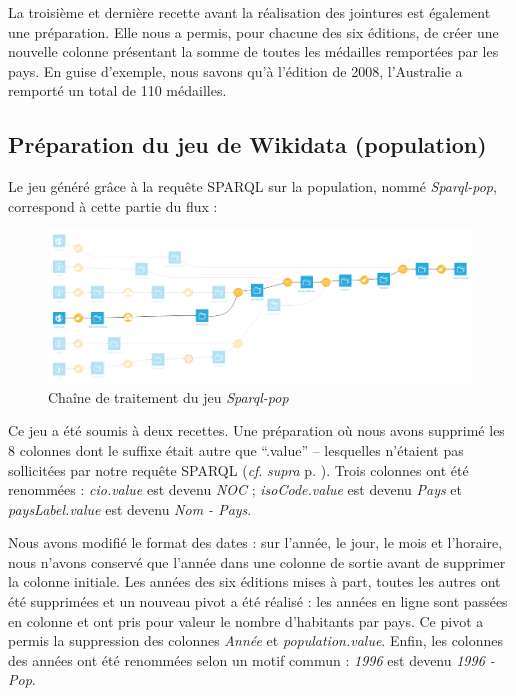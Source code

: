 \documentclass[hidelinks, 12pt]{report}
\begin{document}
La troisième et dernière recette avant la réalisation des jointures est également une préparation. Elle nous a permis, pour chacune des six éditions, de créer une nouvelle colonne présentant la somme de toutes les médailles remportées par les pays. En guise d'exemple, nous savons qu'à l'édition de 2008, l'Australie a remporté un total de 110 médailles.





%





\subsection{Préparation du jeu de Wikidata (population)}

Le jeu généré grâce à la requête SPARQL sur la population, nommé \textit{Sparql-pop}, correspond à cette partie du flux :

\begin{center}
	\begin{figure}[H]
		\setlength{\belowcaptionskip}{-35pt}
		\includegraphics[scale=0.35]{images/flow-medals-sparql-pop.png}
		\caption{Chaîne de traitement du jeu \textit{Sparql-pop}}
	\end{figure}
\end{center}

Ce jeu a été soumis à deux recettes. Une préparation où nous avons supprimé les 8 colonnes dont le suffixe était autre que \enquote{.value} -- lesquelles n'étaient pas sollicitées par notre requête SPARQL (\textit{cf}. \textit{supra} p. \pageref{nongrata}). Trois colonnes ont été renommées : \textit{cio.value} est devenu \textit{NOC} ; \textit{isoCode.value} est devenu \textit{Pays} et \textit{paysLabel.value} est devenu \textit{Nom - Pays}.

Nous avons modifié le format des dates : sur l'année, le jour, le mois et l'horaire, nous n'avons conservé que l'année dans une colonne de sortie avant de supprimer la colonne initiale. Les années des six éditions mises à part, toutes les autres ont été supprimées et un nouveau pivot a été réalisé : les années en ligne sont passées en colonne et ont pris pour valeur le nombre d'habitants par pays. Ce pivot a permis la suppression des colonnes \emph{Année} et \emph{population.value}. Enfin, les colonnes des années ont été renommées selon un motif commun : \emph{1996} est devenu \emph{1996 - Pop}.
\end{document}
